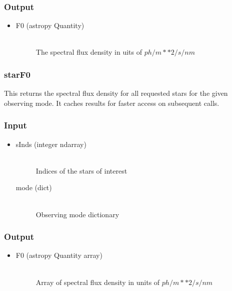 \documentclass[cleanfoot]{asme2ej}
\begin{document}
\subsubsection*{Output}
\begin{itemize}
\item
\begin{description}
    \item[F0 (astropy Quantity)] \hfill \\ The spectral flux density in uits of $ph/m**2/s/nm$
\end{description}
\end{itemize}

\subsubsection{starF0} \label{sec:starF0}
This returns the spectral flux density for all requested stars for the given observing mode. It caches results for faster access on subsequent calls.
\subsubsection*{Input}
\begin{itemize}
\item 
\begin{description}
    \item[sInds (integer ndarray)] \hfill \\ Indices of the stars of interest
    \item[mode (dict)] \hfill \\ Observing mode dictionary
\end{description}
\end{itemize}
\subsubsection*{Output}
\begin{itemize}
\item
\begin{description}
    \item[F0 (astropy Quantity array)] \hfill \\ Array of spectral flux density in units of $ph/m**2/s/nm$
\end{description}
\end{itemize}


\end{document}
